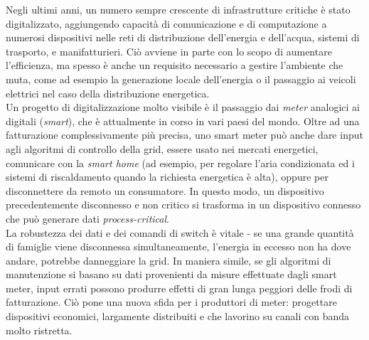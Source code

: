 Negli ultimi anni, un numero sempre crescente di infrastrutture critiche è stato digitalizzato, aggiungendo capacità di comunicazione e di computazione a numerosi dispositivi nelle reti di distribuzione dell'energia e dell'acqua, sistemi di trasporto, e manifatturieri. Ciò avviene in parte con lo scopo di aumentare l'efficienza, ma spesso è anche un requisito necessario a gestire l'ambiente che muta, come ad esempio la generazione locale dell'energia o il passaggio ai veicoli elettrici nel caso della distribuzione energetica.\\
Un progetto di digitalizzazione molto visibile è il passaggio dai \emph{meter} analogici ai digitali (\emph{smart}), che è attualmente in corso in vari paesi del mondo. Oltre ad una fatturazione complessivamente più precisa, uno smart meter può anche dare input agli algoritmi di controllo della grid, essere usato nei mercati energetici, comunicare con la \emph{smart home} (ad esempio, per regolare l'aria condizionata ed i sistemi di riscaldamento quando la richiesta energetica è alta), oppure per disconnettere da remoto un consumatore. In questo modo, un dispositivo precedentemente disconnesso e non critico si trasforma in un dispositivo connesso che può generare dati \emph{process-critical}.\\
La robustezza dei dati e dei comandi di switch è vitale - se una grande quantità di famiglie viene disconnessa simultaneamente, l'energia in eccesso non ha dove andare, potrebbe danneggiare la grid. In maniera simile, se gli algoritmi di manutenzione si basano su dati provenienti da misure effettuate dagli smart meter, input errati possono produrre effetti di gran lunga peggiori delle frodi di fatturazione. Ciò pone una nuova sfida per i produttori di meter: progettare dispositivi economici, largamente distribuiti e che lavorino su canali con banda molto ristretta.
